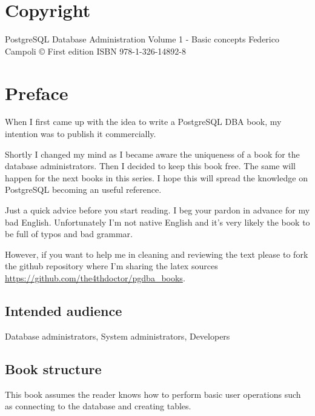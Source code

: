 \documentclass[oneside]{book}
\begin{document}
\chapter*{Copyright}
PostgreSQL Database Administration Volume 1 - Basic concepts\newline
Federico Campoli \copyright {} \newline
First edition\newline
ISBN 978-1-326-14892-8\newline %


 



\chapter*{Preface}
When I first came up with the idea to write a PostgreSQL DBA book, my intention was to 
publish it commercially.\newline

Shortly I changed my mind as I became aware the uniqueness of a book for the database 
administrators. Then I decided to keep this book free. The same will happen for the 
next books in this series. I hope this will spread the knowledge on PostgreSQL becoming an 
useful reference.\newline

Just a quick advice before you start reading. I beg your pardon in advance for my 
bad English. Unfortunately I'm not native English and it's very likely the book to be full of 
typos and bad grammar.\newline

However, if you want to help me in cleaning and reviewing the text please to fork 
the github repository where I'm sharing the latex sources 
\href{https://github.com/the4thdoctor/pgdba\_books}{
https://github.com/the4thdoctor/pgdba\_books}.\newline


\section*{Intended audience}
Database administrators, System administrators, Developers

\section*{Book structure}
This book assumes the reader knows how to perform basic user operations such as
connecting to the database and creating tables.\newline
\end{document}
